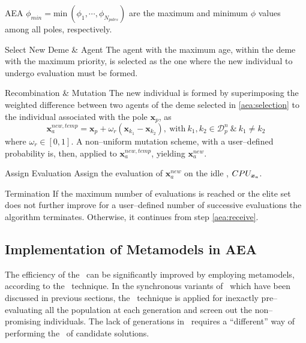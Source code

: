 \documentclass{vki_ls}
\def\Dp{\mathcal{D}_p}
\newcommand{\vect}[1]{\bm{#1}}
\begin{document}
\begin{namedalgorithm}{AEA}
$\phi_{min}=\mbox{min}~(\phi_1,\cdots,\phi_{N_{poles}})$ are the
maximum and minimum $\phi$ values among all poles, respectively.
%
\item[Select New Deme \& Agent]\label{aea:selection}
The agent with the maximum age, within the deme with the maximum priority, is selected as the one where the new individual to undergo evaluation must be formed.
%
\item[Recombination \& Mutation]\label{aea:xover}
The new individual is formed by superimposing the weighted
difference between two agents of the deme selected in \ref{aea:selection} to the individual associated with the pole $\vect{x}_p$, as
%
\begin{equation}\label{aea_xover}
    \vect{x}_a^{new, temp} = \vect{x}_p +
    \omega_r (\vect{x}_{k_1} - \vect{x}_{k_2}), ~\mbox{with}~
    k_1,k_2 \in \Dp^n ~\&~ k_1\neq k_2
\end{equation}
%
where $\omega_r\!\in\![0,1]$. A non--uniform mutation scheme, with a
user--defined probability is, then, applied to $\vect{x}_a^{new, temp}$, 
yielding $\vect{x}_a^{new}$.
%
\item[Assign Evaluation]
Assign the evaluation of $\vect{x}_a^{new}$ on the idle \CPU,
$\CPU_{\vect{x}_a}$.
%
\item[Termination] If the maximum number of evaluations is reached
or the elite set does not further improve for a user--defined
number of successive evaluations the algorithm terminates.
Otherwise, it continues from step \ref{aea:receive}.
\end{namedalgorithm}

%
\subsection[Implementation of Metamodels in AEA]
{Implementation of Metamodels in AEA}
\label{ss:amaea}

The efficiency of the \AEA\ can be significantly improved by employing metamodels, according to the \IPE\ technique.
In the synchronous variants of \EAs\ which have been discussed in previous sections, the \IPE\ technique is applied for inexactly pre--evaluating all the population at each generation and screen out the non--promising individuals. 
The lack of generations in \AEA\ requires a ``different'' way of performing the \IPE\ of candidate solutions.
\end{document}
